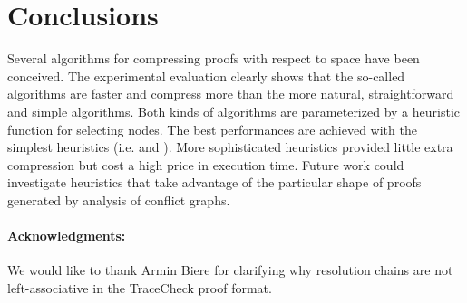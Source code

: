 \documentclass{llncs}
\begin{document}
\section{Conclusions}

Several algorithms for compressing proofs with respect to space have been conceived. The experimental evaluation clearly shows that the so-called  algorithms are faster and compress more than the more natural, straightforward and simple  algorithms. Both kinds of algorithms are parameterized by a heuristic function for selecting nodes. The best performances are achieved with the simplest heuristics (i.e.  and ). More sophisticated heuristics provided little extra compression but cost a high price in execution time. Future work could investigate heuristics that take advantage of the particular shape of proofs generated by analysis of conflict graphs.

\vspace{-5pt}
\paragraph{Acknowledgments:} We would like to thank Armin Biere for clarifying why resolution chains are not left-associative in the TraceCheck proof format.

\vspace{-5pt}



\end{document}
